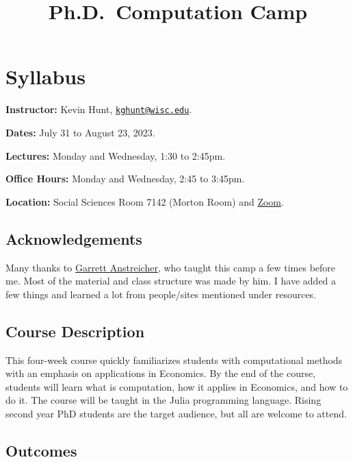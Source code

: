 \documentclass[
]{book}
\title{Ph.D.~Computation Camp}
\author{}
\date{\vspace{-2.5em}}
\begin{document}
\maketitle

{
\setcounter{tocdepth}{1}
\tableofcontents
}
\hypertarget{syllabus}{%
\chapter{Syllabus}\label{syllabus}}

\textbf{Instructor:} Kevin Hunt, \href{mailto:kghunt@wisc.edu}{\nolinkurl{kghunt@wisc.edu}}.

\textbf{Dates:} July 31 to August 23, 2023.

\textbf{Lectures:} Monday and Wednesday, 1:30 to 2:45pm.

\textbf{Office Hours:} Monday and Wednesday, 2:45 to 3:45pm.

\textbf{Location:} Social Sciences Room 7142 (Morton Room) and \href{https://uwmadison.zoom.us/j/93415370734?pwd=V1l1TmdmV2lYYUNkTk5rQmdiZU9Wdz09}{Zoom}.

\hypertarget{acknowledgements}{%
\section{Acknowledgements}\label{acknowledgements}}

Many thanks to \href{https://www.garrettanstreicher.com/}{Garrett Anstreicher}, who taught this camp a few times before me. Most of the material and class structure was made by him. I have added a few things and learned a lot from people/sites mentioned under resources.

\hypertarget{course-description}{%
\section{Course Description}\label{course-description}}

This four-week course quickly familiarizes students with computational methods with an emphasis on applications in Economics. By the end of the course, students will learn what is computation, how it applies in Economics, and how to do it. The course will be taught in the Julia programming language. Rising second year PhD students are the target audience, but all are welcome to attend.

\hypertarget{outcomes}{%
\section{Outcomes}\label{outcomes}}
\end{document}
